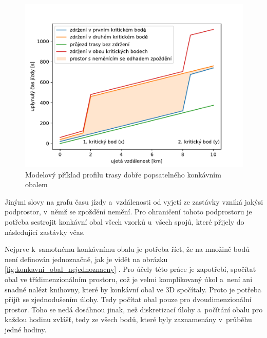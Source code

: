 \begin{figure}
\centering
  \includegraphics[width=\linewidth]{../img/concave_hull}
  \caption{Modelový příklad profilu trasy dobře popsatelného konkávním obalem}
  \label{fig:concave_hull}
\end{figure}


\bigbreak

Jinými slovy na grafu času jízdy a~vzdálenosti od vyjetí ze zastávky vzniká jakýsi podprostor, v~němž se zpoždění nemění. Pro ohraničení tohoto podprostoru je potřeba sestrojit konkávní obal všech vzorků u~všech spojů, které přijely do následující zastávky včas.


\bigbreak

Nejprve k~samotnému konkávnímu obalu je potřeba říct, že na množině bodů není definován jednoznačně, jak je vidět na obrázku \ref{fig:konkavni_obal_nejednoznacny} \citet{Asaeedi}. Pro účely této práce je zapotřebí, spočítat obal ve třídimenzionálním prostoru, což je velmi komplikovaný úkol a~není ani snadné nalézt knihovny, které by konkávní obal ve 3D spočítaly. Proto je potřeba přijít se zjednodušením úlohy. Tedy počítat obal pouze pro dvoudimenzionální prostor. Toho se nedá dosáhnou jinak, než diskretizací úlohy a~počítání obalu pro každou hodinu zvlášť, tedy ze všech bodů, které byly zaznamenány v~průběhu jedné hodiny.


